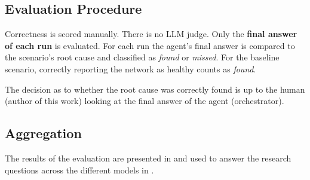 \subsection{Evaluation Procedure}
\label{sec:evaluation-procedure}
Correctness is scored manually. There is no LLM judge. Only the \textbf{final answer of each run} is
evaluated. For each run the
agent's final answer is compared to the scenario's root cause and classified as \emph{found} or
\emph{missed}. For the baseline scenario, correctly reporting the network
as healthy counts as \emph{found}.

The decision as to whether the root cause was correctly found is up to the human (author of this work) looking at the final answer of the agent (orchestrator).

\subsection{Aggregation}
\label{sec:aggregation}
The results of the evaluation are presented in  and used to answer the
research questions across the different models in .
